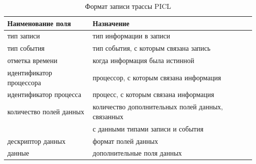 \begin{table}[h!]
	\caption{\label{tab:tbl1}Формат записи трассы PICL}
	\begin{tabular}{|l|l|}
		\hline
		Наименование поля & Назначение \\
		\hline\hline
		тип записи&тип информации в записи
		\\\hline
		тип события &тип события, с которым связана запись
		\\\hline
		отметка времени&когда информация была истинной\\\hline
		идентификатор процессора
		&процессор, с которым связана информация
		\\\hline
		идентификатор процесса	
		&процесс, с которым связана информация	
		\\\hline
		количество полей данных	
		&количество дополнительных полей данных, связанных \tabularnewline & с данными типами записи и события	
		\\\hline
		дескриптор данных	
		&формат полей данных
		\\\hline
		данные	
		&дополнительные поля данных
		\\\hline
		
	\end{tabular}
\end{table}

